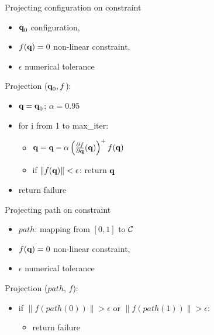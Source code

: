 %
%

\begin {frame} {Projecting configuration on constraint}
  \begin {itemize}
  \item $\textbf{q}_0$ configuration,
  \item $f(\textbf{q}) = 0$ non-linear constraint,
  \item $\epsilon$ numerical tolerance
  \end {itemize}
  Projection ($\textbf{q}_0, f$):
  \begin{itemize}
    \item [] $\textbf{q} = \textbf{q}_0$; $\alpha = 0.95$
    \item [] for i from 1 to max\_iter:
      \begin {itemize}
      \item [] $\textbf{q} = \textbf{q} - \alpha \left(\frac {\partial f}{\partial \textbf{q}}(\textbf{q})\right)^{+} f (\textbf{q})$
      \item [] if $\|f(\textbf{q})\| < \epsilon$: return $\textbf{q}$
      \end {itemize}
    \item [] return failure
  \end{itemize}

\end {frame}

%
%

\begin {frame} {Projecting path on constraint}
  \begin {itemize}
  \item $path$: mapping from $[0,1]$ to ${\cal C}$
  \item $f(\textbf{q}) = 0$ non-linear constraint,
  \item $\epsilon$ numerical tolerance
  \end {itemize}
  Projection ($path$, $f$):
  \begin{itemize}
    \item [] if $\|f(path (0))\| > \epsilon$ or $\|f(path (1))\| > \epsilon$:
      \begin {itemize}
      \item [] return failure
      \end {itemize}

  \end{itemize}

\end {frame}

%
%

